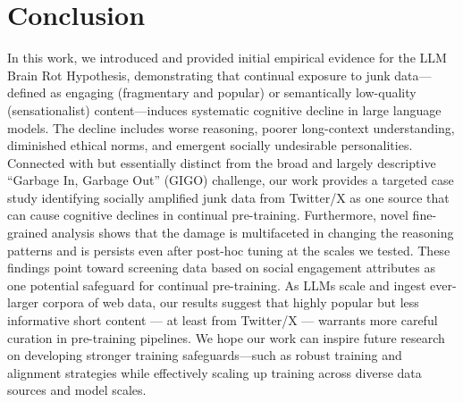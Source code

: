 \vspace{-5mm}
\section{Conclusion}

\vspace{-3mm}
In this work, we introduced and provided initial empirical evidence for the LLM Brain Rot Hypothesis,
demonstrating that continual exposure to junk data---defined as engaging (fragmentary and popular) or semantically low-quality (sensationalist) content---induces systematic cognitive decline in large language models. 
The decline includes worse reasoning, poorer long-context understanding, diminished ethical norms, and emergent socially undesirable personalities.
Connected with but essentially distinct from the broad and largely descriptive “Garbage In, Garbage Out” (GIGO) challenge, our work provides a targeted case study identifying socially amplified junk data from Twitter/X as one source that can cause cognitive declines in continual pre-training.
Furthermore, novel fine-grained analysis shows that the damage is multifaceted in changing the reasoning patterns and is persists even after post-hoc tuning at the scales we tested.
These findings point toward screening data based on social engagement attributes as one potential safeguard for continual pre-training.
As LLMs scale and ingest ever-larger corpora of web data, our results suggest that highly popular but less informative short content — at least from Twitter/X — warrants more careful curation in pre-training pipelines.
We hope our work can inspire future research on developing stronger training safeguards—such as robust training and alignment strategies while effectively scaling up training across diverse data sources and model scales.
